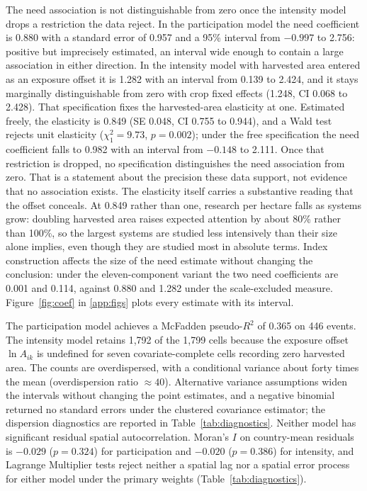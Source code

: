 \documentclass[ASNA,twocolumn]{USG}
\begin{document}
The need association is not distinguishable from zero once the intensity model drops a
restriction the data reject. In the participation model the need coefficient is 0.880 with a standard error of 0.957 and a 95\%
interval from $-0.997$ to 2.756: positive but imprecisely estimated, an interval wide enough to
contain a large association in either direction. In the intensity model with harvested area entered
as an exposure offset it is 1.282 with an interval from 0.139 to 2.424, and it stays marginally
distinguishable from zero with crop fixed effects (1.248, CI 0.068 to 2.428). That specification
fixes the harvested-area elasticity at one. Estimated freely, the elasticity is 0.849 (SE 0.048, CI
0.755 to 0.944), and a Wald test rejects unit elasticity ($\chi^{2}_{1} = 9.73$, $p = 0.002$);
under the free specification the need coefficient falls to 0.982 with an interval from $-0.148$ to
2.111. Once that restriction is dropped, no specification distinguishes the need association from zero.
That is a statement about the precision these data support, not evidence that no association
exists. The elasticity itself carries a substantive
reading that the offset conceals. At 0.849 rather than one, research per hectare falls as systems
grow: doubling harvested area raises expected attention by about 80\% rather than 100\%, so the
largest systems are studied less intensively than their size alone implies, even though they are
studied most in absolute terms. Index construction affects the size of the need estimate without
changing the conclusion: under the eleven-component variant the two need coefficients are 0.001 and 0.114, against 0.880 and
1.282 under the scale-excluded measure.
Figure~\ref{fig:coef} in \ref{app:figs} plots every estimate with its interval.

The participation model achieves a McFadden pseudo-$R^{2}$ of 0.365 on 446 events. The
intensity model retains 1,792 of the 1,799 cells because the exposure offset $\ln A_{ik}$ is
undefined for seven covariate-complete cells recording zero harvested area. The counts are overdispersed, with a conditional variance about forty times the mean
(overdispersion ratio $\approx 40$). Alternative variance assumptions widen the intervals without
changing the point estimates, and a negative binomial returned no standard errors under the
clustered covariance estimator; the dispersion diagnostics are reported in
Table~\ref{tab:diagnostics}. Neither model has significant residual spatial autocorrelation. Moran's $I$ on country-mean
residuals is $-0.029$ ($p = 0.324$) for participation and $-0.020$ ($p = 0.386$) for intensity,
and Lagrange Multiplier tests reject neither a spatial lag nor a spatial error process for either
model under the primary weights (Table~\ref{tab:diagnostics}).
\end{document}
